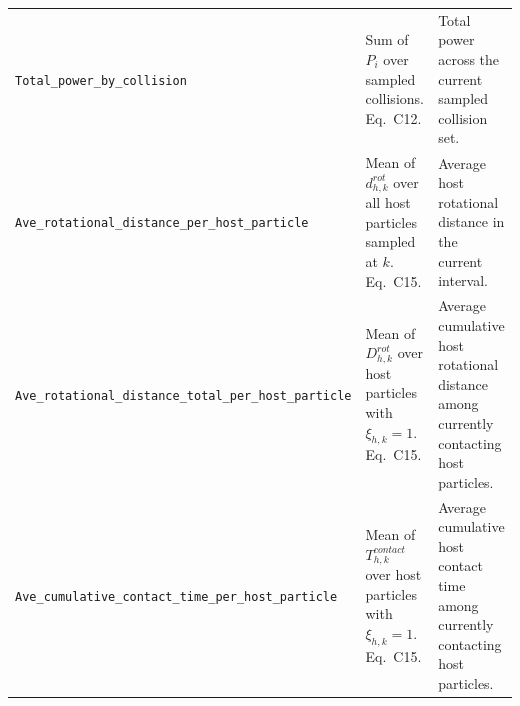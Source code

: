 \documentclass[11pt,a4paper]{article}
\newcommand{\code}[1]{\begingroup\urlstyle{tt}\footnotesize\nolinkurl{#1}\endgroup}
\begin{document}
\begin{longtable}{@{}L{0.33\textwidth}L{0.22\textwidth}L{0.37\textwidth}@{}}
\code{Total_power_by_collision} & Sum of $P_i$ over sampled collisions. Eq.~C12. & Total power across the current sampled collision set.\\
\code{Ave_rotational_distance_per_host_particle} & Mean of $d_{h,k}^{rot}$ over all host particles sampled at $k$. Eq.~C15. & Average host rotational distance in the current interval.\\
\code{Ave_rotational_distance_total_per_host_particle} & Mean of $D_{h,k}^{rot}$ over host particles with $\xi_{h,k} = 1$. Eq.~C15. & Average cumulative host rotational distance among currently contacting host particles.\\
\code{Ave_cumulative_contact_time_per_host_particle} & Mean of $T_{h,k}^{contact}$ over host particles with $\xi_{h,k} = 1$. Eq.~C15. & Average cumulative host contact time among currently contacting host particles.\\
\bottomrule
\end{longtable}
\normalsize
\end{document}
